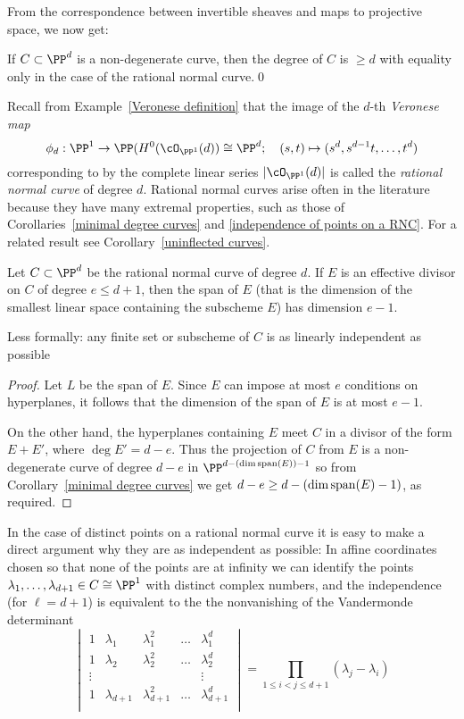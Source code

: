 From the correspondence between invertible sheaves and maps to projective space, we now get:
\begin{corollary}\label{minimal degree curves}
If $C\subset \PP^d$ is a  non-degenerate curve, then the degree of $C$ is $\geq d$ with equality only in the case
of the rational normal curve.\qed
\end{corollary}

Recall from Example~\ref{Veronese definition} that the image of the $d$-th \emph{Veronese map}  
$$
\phi_d: \PP^1 \to \PP(H^0(\cO_{\PP^1}(d)) \cong \PP^d; \quad (s,t) \mapsto (s^d, s^{d-1}t, \dots, t^d)
$$
corresponding to by the complete linear series $|\cO_{\PP^1}(d)|$ is called the \emph{rational normal curve} of degree $d$. Rational normal curves arise often in the literature because they have many extremal properties, such as those of Corollaries~\ref{minimal degree curves} and \ref{independence of points on a RNC}. For a related result see Corollary~\ref{uninflected curves}.

\begin{corollary}\label{independence of points on a RNC}
Let $C\subset \PP^d$ be the rational normal curve of degree $d$. If $E$ is an effective divisor on $C$ of degree $e\leq d+1$, then the
span of $E$ (that is the dimension of the smallest linear space containing the subscheme $E$) has dimension $e-1$.
\end{corollary}
Less formally: any finite set or subscheme of $C$ is as linearly independent as possible

\begin{proof}
Let $L$ be the span of $E$. Since $E$ can impose at most $e$ conditions on hyperplanes, it follows that the dimension of the span of $E$ is
at most $e-1$.

On the other hand, the hyperplanes containing $E$ meet $C$ in a divisor of the form $E+E'$, where
$\deg E' = d-e$. Thus the projection of $C$ from $E$ is a non-degenerate curve of degree $d-e$ in $\PP^{d-(\dim {\rm span}(E))-1}$
so from Corollary~\ref{minimal degree curves} we get $d-e \geq d-(\dim {\rm span}(E)-1)$, as required.
\end{proof}

In the case of distinct points on a rational normal curve
it is easy to make a direct argument why they are as independent as possible: In affine coordinates chosen so that none of the points are
at infinity we can identify the points $\lambda_1,\dots,\lambda_{d+1} \in C \cong \PP^1$ with distinct complex numbers, and the independence (for $\ell = d+1$) is equivalent to the the nonvanishing of the Vandermonde determinant
$$
\begin{vmatrix}
1 & \lambda_1 & \lambda_1^2 & \dots & \lambda_1^d \\
1 & \lambda_2 & \lambda_2^2 & \dots & \lambda_2^d \\
\vdots & & & & \vdots \\
1 & \lambda_{d+1} & \lambda_{d+1}^2 & \dots & \lambda_{d+1}^d \\
\end{vmatrix}
= \prod_{1 \leq i < j \leq d+1} (\lambda_j - \lambda_i)
$$


